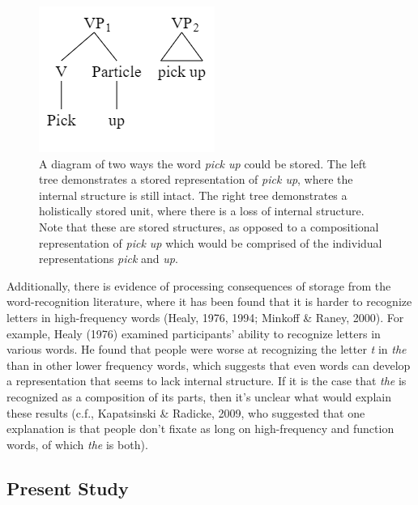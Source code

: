\documentclass[
  man,floatsintext]{apa6}
\begin{document}
\begin{figure}

{\centering \includegraphics[width=0.3\linewidth]{Figures/syntax_tree} 

}

\caption{A diagram of two ways the word \emph{pick up} could be stored. The left tree demonstrates a stored representation of \emph{pick up}, where the internal structure is still intact. The right tree demonstrates a holistically stored unit, where there is a loss of internal structure. Note that these are stored structures, as opposed to a compositional representation of \emph{pick up} which would be comprised of the individual representations \emph{pick} and \emph{up}.}\label{fig:lossInternal}
\end{figure}

Additionally, there is evidence of processing consequences of storage from the word-recognition literature, where it has been found that it is harder to recognize letters in high-frequency words (Healy, 1976, 1994; Minkoff \& Raney, 2000). For example, Healy (1976) examined participants' ability to recognize letters in various words. He found that people were worse at recognizing the letter \emph{t} in \emph{the} than in other lower frequency words, which suggests that even words can develop a representation that seems to lack internal structure. If it is the case that \emph{the} is recognized as a composition of its parts, then it's unclear what would explain these results (c.f., Kapatsinski \& Radicke, 2009, who suggested that one explanation is that people don't fixate as long on high-frequency and function words, of which \emph{the} is both).

\subsection{Present Study}\label{present-study}
\end{document}
